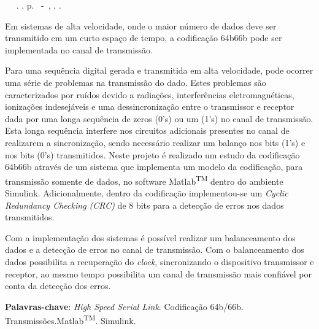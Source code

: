 \setlength{\absparsep}{18pt} %
\begin{resumo}
	\begin{flushleft} 
			\setlength{\absparsep}{0pt} %
			\SingleSpacing 
			\imprimirautorabr~ ~\textbf{\imprimirtitulo}.	\imprimirdata. \pageref{LastPage}p. 
			\imprimirtipotrabalho~-~\imprimirinstituicao, \imprimirlocal, \imprimirdata. 
 	\end{flushleft}
\OnehalfSpacing 		
	
Em sistemas de alta velocidade, onde o maior número de dados deve ser transmitido em um curto espaço de tempo, a codificação 64b66b pode ser implementada no canal de transmissão.
 
Para uma sequência digital gerada e transmitida em alta velocidade, pode ocorrer uma série de problemas na transmissão do dado. Estes problemas são caracterizados por ruídos devido a radiações, interferências eletromagnéticas, ionizações indesejáveis e uma dessincronização entre o transmissor e receptor dada por uma longa sequência de zeros (0’s) ou um (1’s) no canal de transmissão. Esta longa sequência interfere nos circuitos adicionais presentes no canal de realizarem a sincronização, sendo necessário realizar um balanço nos bits (1’s) e nos bits (0’s) transmitidos. Neste projeto é realizado um estudo da codificação 64b66b através de um sistema que implementa um modelo da codificação, para transmissão somente de dados, no software Matlab\textsuperscript{TM} dentro do ambiente Simulink. Adicionalmente, dentro da codificação implementou-se um \textit{Cyclic Redundancy Checking (CRC)} de 8 bits para a detecção de erros nos dados transmitidos.
 
Com a implementação dos sistemas é possível realizar um balanceamento dos dados e a detecção de erros no canal de transmissão. Com o balanceamento dos dados possibilita a recuperação do \textit{clock}, sincronizando o dispositivo transmissor e receptor, ao mesmo tempo possibilita um canal de transmissão mais confiável por conta da detecção dos erros.

 \textbf{Palavras-chave}: \textit{High Speed Serial Link}. Codificação 64b/66b. Transmissões.Matlab\textsuperscript{TM}. Simulink.
\end{resumo}